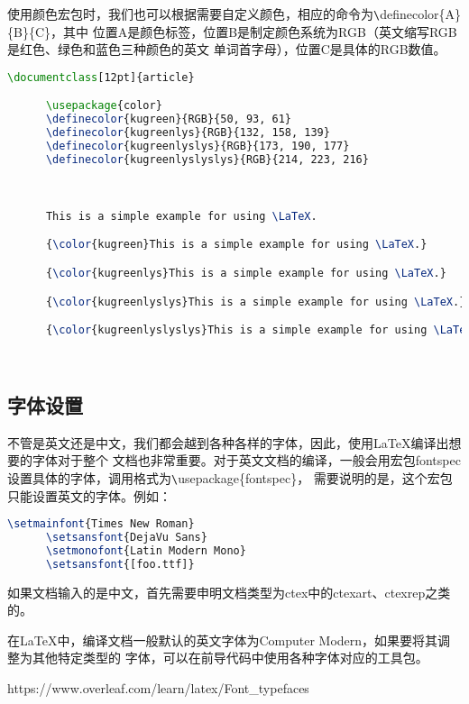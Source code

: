 {使用颜色宏包时，我们也可以根据需要自定义颜色，相应的命令为\verb|\|definecolor\{A\}\{B\}\{C\}，其中
位置A是颜色标签，位置B是制定颜色系统为RGB（英文缩写RGB是红色、绿色和蓝色三种颜色的英文
单词首字母），位置C是具体的RGB数值。
\begin{lstlisting}[language=TeX]
      \documentclass[12pt]{article}

      \usepackage{color}
      \definecolor{kugreen}{RGB}{50, 93, 61}
      \definecolor{kugreenlys}{RGB}{132, 158, 139}
      \definecolor{kugreenlyslys}{RGB}{173, 190, 177}
      \definecolor{kugreenlyslyslys}{RGB}{214, 223, 216}

      

      This is a simple example for using \LaTeX.

      {\color{kugreen}This is a simple example for using \LaTeX.}

      {\color{kugreenlys}This is a simple example for using \LaTeX.}

      {\color{kugreenlyslys}This is a simple example for using \LaTeX.}

      {\color{kugreenlyslyslys}This is a simple example for using \LaTeX.}

      
\end{lstlisting}

\subsection{字体设置}
不管是英文还是中文，我们都会越到各种各样的字体，因此，使用LaTeX编译出想要的字体对于整个
文档也非常重要。对于英文文档的编译，一般会用宏包fontspec设置具体的字体，调用格式为\verb|\|usepackage\{fontspec\}，
需要说明的是，这个宏包只能设置英文的字体。例如：
\begin{lstlisting}[language=TeX]
      \setmainfont{Times New Roman}
      \setsansfont{DejaVu Sans}
      \setmonofont{Latin Modern Mono}
      \setsansfont{[foo.ttf]}   
\end{lstlisting}

如果文档输入的是中文，首先需要申明文档类型为ctex中的ctexart、ctexrep之类的。

在LaTeX中，编译文档一般默认的英文字体为Computer Modern，如果要将其调整为其他特定类型的
字体，可以在前导代码中使用各种字体对应的工具包。

\begin{tcolorbox}[colback=red!5!white, colframe=red!50!black,
            title=更多字体设置参考]
      https://www.overleaf.com/learn/latex/Font\_typefaces
\end{tcolorbox}

}

